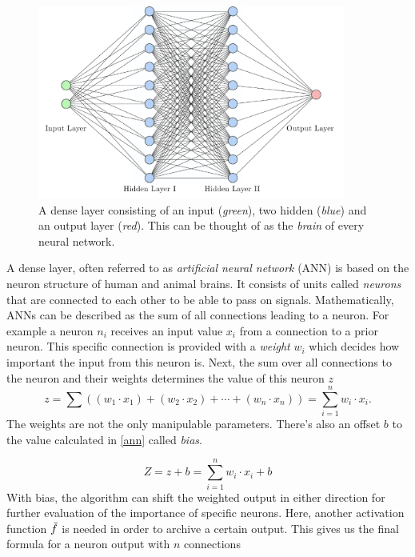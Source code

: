 \begin{figure}[h]
\centering
\includegraphics[width=0.9\textwidth]{images/Chapter2/nn.png}
\caption{A dense layer consisting of an input (\textit{green}), two hidden (\textit{blue}) and an output layer (\textit{red}). This can be thought of as the \textit{brain} of every neural network. } 
\label{fig:dense}
\end{figure}

A dense layer, often referred to as \textit{artificial neural network} (ANN) is based on the neuron structure of human and animal brains. It consists of units called \textit{neurons} that are connected to each other to be able to pass on signals. Mathematically, ANNs can be described as the sum of all connections leading to a neuron. For example a neuron $n_i$ receives an input value $x_i$ from a connection to a prior neuron. This specific connection is provided with a \textit{weight} $w_i$ which decides how important the input from this neuron is. Next, the sum over all connections to the neuron and their weights determines the value of this neuron $z$
\begin{equation}
\label{ann}
    z  = \sum \left( (w_1 \cdot x_1) + (w_2 \cdot x_2) + \cdots + (w_n \cdot x_n) \right) = \sum^n_{i=1} w_i \cdot x_i.
\end{equation}
The weights are not the only manipulable parameters. There's also an offset $b$ to the value calculated in \eqref{ann} called \textit{bias}.

\begin{equation}
\label{bias}
    Z  = z + b = \sum^n_{i=1} w_i \cdot x_i + b
\end{equation}
With bias, the algorithm can shift the weighted output in either direction for further evaluation of the importance of specific neurons. Here, another activation function $\Tilde{f}$ is needed in order to archive a certain output. This gives us the final formula for a neuron output with $n$ connections

